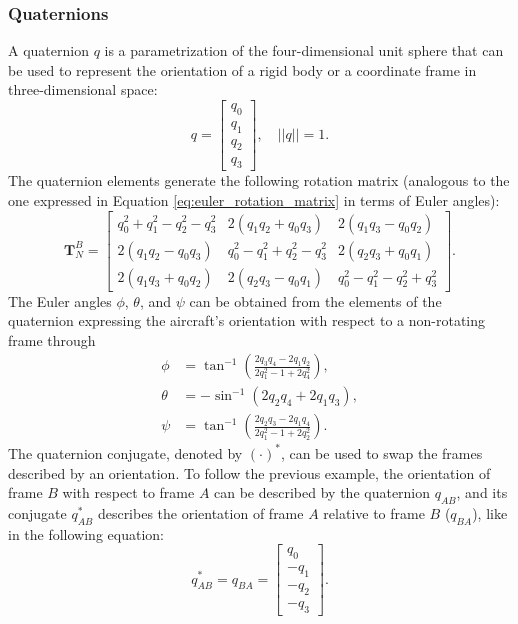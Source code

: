 \subsubsection{Quaternions}
A quaternion \( q \) is a parametrization of the four-dimensional unit sphere that can be used to represent the orientation of a rigid body or a coordinate frame in three-dimensional space:
\begin{equation}
    q = \begin{bmatrix} 
        q_0 \\ 
        q_1 \\ 
        q_2 \\ 
        q_3 
    \end{bmatrix}, \quad ||q|| = 1.    
\end{equation}
The quaternion elements generate the following rotation matrix (analogous to the one expressed in Equation \eqref{eq:euler_rotation_matrix} in terms of Euler angles):
\begin{equation}
\mathbf{T}_{N}^{B} = \begin{bmatrix} 
    q_0^2 + q_1^2 - q_2^2 - q_3^2 & 2(q_1q_2 + q_0q_3) & 2(q_1q_3 - q_0q_2) \\ 
    2(q_1q_2 - q_0q_3) & q_0^2 - q_1^2 + q_2^2 - q_3^2 & 2(q_2q_3 + q_0q_1) \\ 
    2(q_1q_3 + q_0q_2) & 2(q_2q_3 - q_0q_1) & q_0^2 - q_1^2 - q_2^2 + q_3^2 
\end{bmatrix}.
\end{equation}
The Euler angles \(\phi\), \(\theta\), and \(\psi\) can be obtained from the elements of the quaternion expressing the aircraft’s orientation with respect to a non-rotating frame through
\begin{align}
    \phi &= \tan^{-1} \left( \frac{2q_3q_4 - 2q_1q_2}{2q_1^2 - 1 + 2q_4^2} \right), \label{eq:euler_angles_phi} \\
    \theta &= -\sin^{-1}(2q_2q_4 + 2q_1q_3), \label{eq:euler_angles_theta} \\
    \psi &= \tan^{-1} \left( \frac{2q_2q_3 - 2q_1q_4}{2q_1^2 - 1 + 2q_2^2} \right). \label{eq:euler_angles_psi}
\end{align}
The quaternion conjugate, denoted by \( (\cdot)^* \), can be used to swap the frames described by an orientation. To follow the previous example, the orientation of frame \( B \) with respect to frame \( A \) can be described by the quaternion \( q_{AB} \), and its conjugate \( q_{AB}^* \) describes the orientation of frame \( A \) relative to frame \( B \) (\( q_{BA} \)), like in the following equation:
\begin{equation}
q_{AB}^* = q_{BA} = \begin{bmatrix} 
    q_0 \\ 
    -q_1 \\ 
    -q_2 \\ 
    -q_3 
\end{bmatrix}.
\end{equation}

